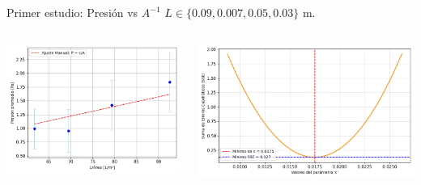 \documentclass{beamer}
\begin{document}
\begin{frame}{Primer estudio: Presión vs $A^{-1}$}
  \small $L \in \{ \textit{0.09}, \textit{0.007}, \textit{0.05}, \textit{0.03} \}$ m.
  \begin{columns}
    \begin{column}{0.50\textwidth}
      \includegraphics[width=1.10\linewidth]{photoMaterial/Pv1__A_Ajuste.png}
    \end{column}
    \begin{column}{0.50\textwidth}
      \includegraphics[width=1.10\linewidth]{photoMaterial/CPv1_A.png}
    \end{column}
  \end{columns}
\end{frame}
\end{document}
